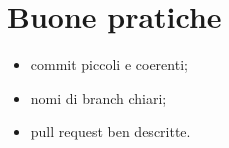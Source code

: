 \section{Buone pratiche}

\begin{itemize}
  \item commit piccoli e coerenti;
  \item nomi di branch chiari;
  \item pull request ben descritte.
\end{itemize}